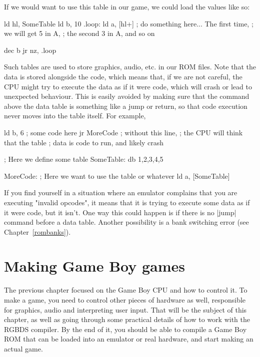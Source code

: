 \documentclass[11pt]{book}
\begin{document}
If we would want to use this table in our game, we could load the values like so:

\begin{code}
ld hl, SomeTable
ld b, 10
.loop:
    ld a, [hl+]
    ; do something here... The first time, 
    ; we will get 5 in A, 
    ; the second 3 in A, and so on
    
    dec b
    jr nz, .loop
\end{code}

Such tables are used to store graphics, audio, etc. in our ROM files. Note that the data is stored alongside the code, which means that, if we are not careful, the CPU might try to execute the data as if it were code, which will crash or lead to unexpected behaviour. This is easily avoided by making sure that the command above the data table is something like a jump or return, so that code execution never moves into the table itself. For example, 

\begin{code}
    ld b, 6 ; some code here
    jr MoreCode ; without this line, 
    ; the CPU will think that the table
    ; data is code to run, and likely crash 

; Here we define some table 
SomeTable:
    db 1,2,3,4,5

MoreCode:
    ; Here we want to use the table or whatever 
    ld a, [SomeTable]
\end{code}

If you find yourself in a situation where an emulator complains that you are executing "invalid opcodes", it means that it is trying to execute some data as if it were code, but it isn't. One way this could happen is if there is no |jump| command before a data table. Another possibility is a bank switching error (see Chapter~\ref{rombanks}).

\chapter{Making Game Boy games}
\label{gbgames}
The previous chapter focused on the Game Boy CPU and how to control it. To make a game, you need to control other pieces of hardware as well, responsible for graphics, audio and interpreting user input. That will be the subject of this chapter, as well as going through some practical details of how to work with the RGBDS compiler. By the end of it, you should be able to compile a Game Boy ROM that can be loaded into an emulator or real hardware, and start making an actual game.
\end{document}
